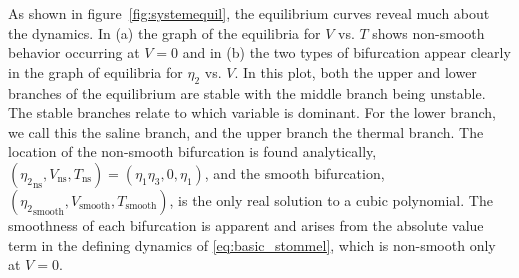\indent As shown in figure~\ref{fig:systemequil}, the equilibrium curves reveal much about the dynamics. In (a) the graph of the equilibria for $V$ vs. $T$ shows non-smooth behavior occurring at $V=0$ and in (b) the two types of bifurcation appear clearly in the graph of equilibria for $\eta_2$ vs. $V$. In this plot, both the upper and lower branches of the equilibrium are stable with the middle branch being unstable. The stable branches relate to which variable is dominant. For the lower branch, we call this the saline branch, and the upper branch the thermal branch. The location of the non-smooth bifurcation is found analytically, $({\eta_2}_{\text{ns}},V_{\text{ns}},T_{\text{ns}})=(\eta_1\eta_3,0,\eta_1)$, and the smooth bifurcation, $({\eta_2}_{\text{smooth}},V_{\text{smooth}},T_{\text{smooth}})$, is the only real solution to a cubic polynomial. The smoothness of each bifurcation is apparent and arises from the absolute value term in the defining dynamics of \eqref{eq:basic_stommel}, which is non-smooth only at $V=0$.


